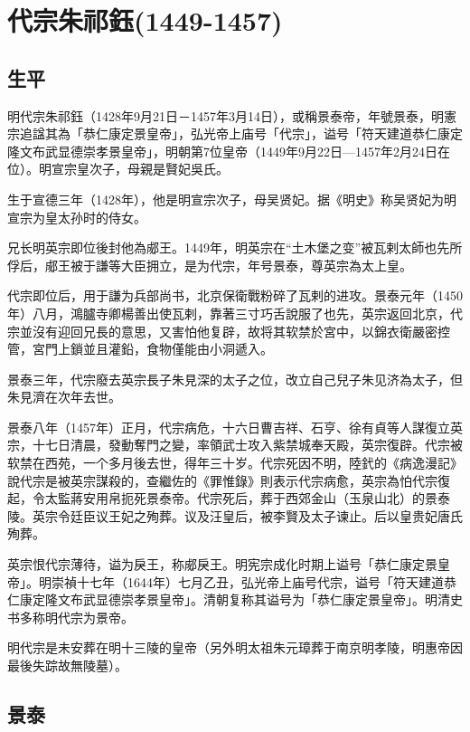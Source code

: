 
\section{代宗朱祁鈺\tiny(1449-1457)}

\subsection{生平}

明代宗朱祁鈺（1428年9月21日－1457年3月14日），或稱景泰帝，年號景泰，明憲宗追諡其為「恭仁康定景皇帝」，弘光帝上庙号「代宗」，谥号「符天建道恭仁康定隆文布武显德崇孝景皇帝」，明朝第7位皇帝（1449年9月22日—1457年2月24日在位）。明宣宗皇次子，母親是賢妃吳氏。

生于宣德三年（1428年），他是明宣宗次子，母吴贤妃。据《明史》称吴贤妃为明宣宗为皇太孙时的侍女。

兄长明英宗即位後封他為郕王。1449年，明英宗在“土木堡之变”被瓦剌太師也先所俘后，郕王被于謙等大臣拥立，是为代宗，年号景泰，尊英宗為太上皇。

代宗即位后，用于謙为兵部尚书，北京保衛戰粉碎了瓦剌的进攻。景泰元年（1450年）八月，鴻臚寺卿楊善出使瓦剌，靠著三寸巧舌說服了也先，英宗返回北京，代宗並沒有迎回兄長的意思，又害怕他复辟，故将其软禁於宮中，以錦衣衛嚴密控管，宮門上鎖並且灌鉛，食物僅能由小洞遞入。

景泰三年，代宗廢去英宗長子朱見深的太子之位，改立自己兒子朱见济為太子，但朱見濟在次年去世。

景泰八年（1457年）正月，代宗病危，十六日曹吉祥、石亨、徐有貞等人謀復立英宗，十七日清晨，發動奪門之變，率領武士攻入紫禁城奉天殿，英宗復辟。代宗被软禁在西苑，一个多月後去世，得年三十岁。代宗死因不明，陸釴的《病逸漫記》說代宗是被英宗謀殺的，查繼佐的《罪惟錄》則表示代宗病愈，英宗為怕代宗復起，令太監蔣安用帛扼死景泰帝。代宗死后，葬于西郊金山（玉泉山北）的景泰陵。英宗令廷臣议王妃之殉葬。议及汪皇后，被李賢及太子谏止。后以皇贵妃唐氏殉葬。

英宗恨代宗薄待，谥为戾王，称郕戾王。明宪宗成化时期上谥号「恭仁康定景皇帝」。明崇禎十七年（1644年）七月乙丑，弘光帝上庙号代宗，谥号「符天建道恭仁康定隆文布武显德崇孝景皇帝」。清朝复称其谥号为「恭仁康定景皇帝」。明清史书多称明代宗为景帝。

明代宗是未安葬在明十三陵的皇帝（另外明太祖朱元璋葬于南京明孝陵，明惠帝因最後失踪故無陵墓）。

\subsection{景泰}

